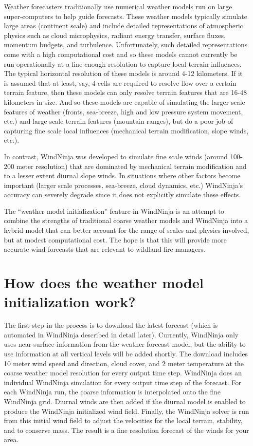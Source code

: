 \documentclass[12pt]{article}
\begin{document}
Weather forecasters traditionally use numerical weather models run on large super-computers to help guide forecasts.  These weather models typically simulate large areas (continent scale) and include detailed representations of atmospheric physics such as cloud microphysics, radiant energy transfer, surface fluxes, momentum budgets, and turbulence.  Unfortunately, such detailed representations come with a high computational cost and so these models cannot currently be run operationally at a fine enough resolution to capture local terrain influences.  The typical horizontal resolution of these models is around 4-12 kilometers.  If it is assumed that at least, say, 4 cells are required to resolve flow over a certain terrain feature, then these models can only resolve terrain features that are 16-48 kilometers in size.  And so these models are capable of simulating the larger scale features of weather (fronts, sea-breeze, high and low pressure system movement, etc.) and large scale terrain features (mountain ranges), but do a poor job of capturing fine scale local influences (mechanical terrain modification, slope winds, etc.).

In contrast, WindNinja was developed to simulate fine scale winds (around 100-200 meter resolution) that are dominated by mechanical terrain modification and to a lesser extent diurnal slope winds.  In situations where other factors become important (larger scale processes, sea-breeze, cloud dynamics, etc.) WindNinja's accuracy can severely degrade since it does not explicitly simulate these effects.

The “weather model initialization” feature in WindNinja is an attempt to combine the strengths of traditional coarse weather models and WindNinja into a hybrid model that can better account for the range of scales and physics involved, but at modest computational cost.  The hope is that this will provide more accurate wind forecasts that are relevant to wildland fire managers.

\section*{How does the weather model initialization work?}

The first step in the process is to download the latest forecast (which is automated in WindNinja described in detail later).  Currently, WindNinja only uses near surface information from the weather forecast model, but the ability to use information at all vertical levels will be added shortly.  The download includes 10 meter wind speed and direction, cloud cover, and 2 meter temperature at the coarse weather model resolution for every output time step.  WindNinja does an individual WindNinja simulation for every output time step of the forecast.  For each WindNinja run, the coarse information is interpolated onto the fine WindNinja grid.  Diurnal winds are then added if the diurnal model is enabled to produce the WindNinja initialized wind field.  Finally, the WindNinja solver is run from this initial wind field to adjust the velocities for the local terrain, stability, and to conserve mass.  The result is a fine resolution forecast of the winds for your area.
\end{document}
